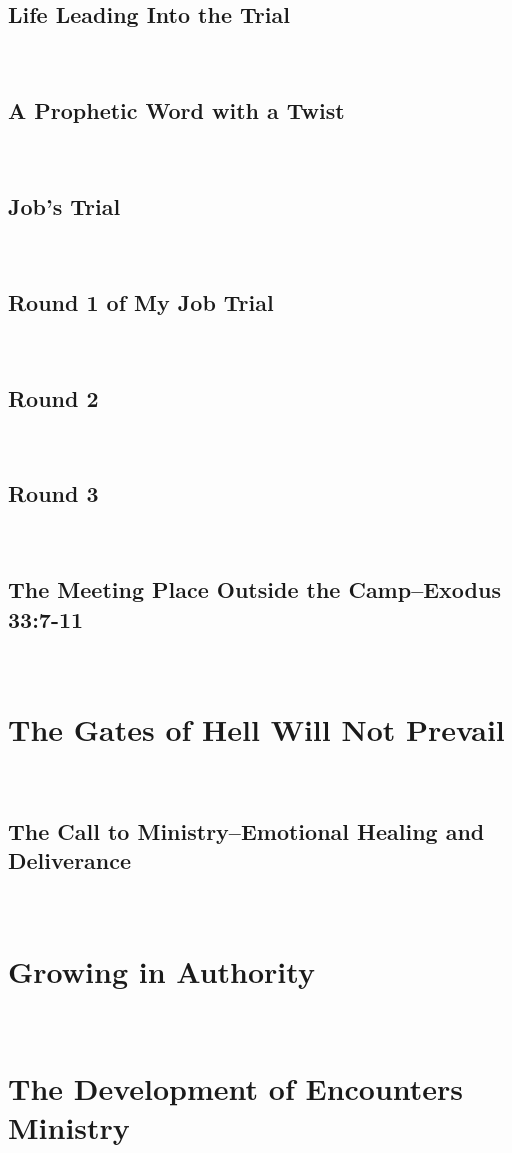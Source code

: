 \documentclass[oneside]{book}
\begin{document}
\section{Life Leading Into the Trial}
\

\section{A Prophetic Word with a Twist}
\

\section{Job's Trial}
\

\section{Round 1 of My Job Trial}
\

\section{Round 2}
\

\section{Round 3}
\

\section{The Meeting Place Outside the Camp--Exodus 33:7-11}
\

\chapter{The Gates of Hell Will Not Prevail}
\

\section{The Call to Ministry--Emotional Healing and Deliverance}
\

\chapter{Growing in Authority}
\

\chapter{The Development of Encounters Ministry}
\
\end{document}
